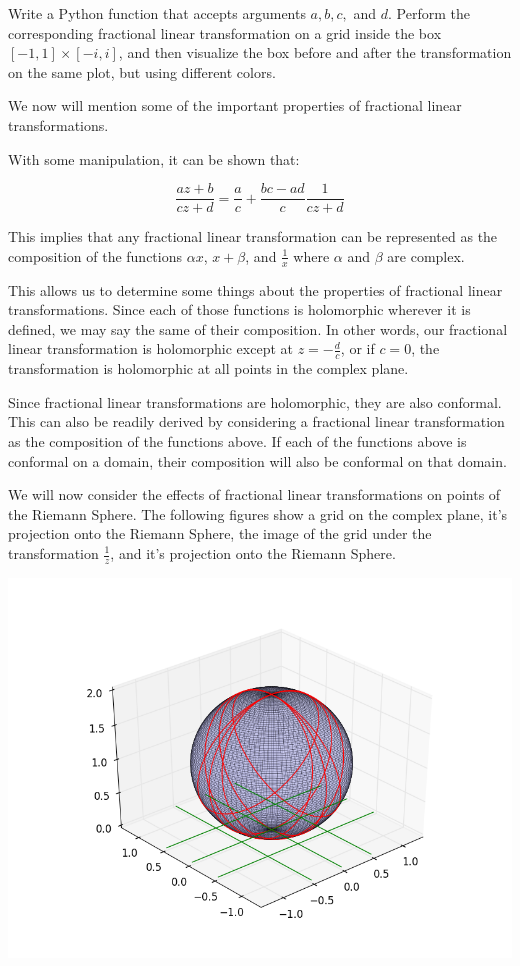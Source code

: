 \begin{problem} Write a Python function that accepts arguments $a,b,c,$ and $d$. Perform the corresponding fractional linear transformation on a grid inside the box $[-1,1]\times[-i,i]$, and then visualize the box before and after the transformation on the same plot, but using different colors.
\end{problem}

We now will mention some of the important properties of fractional linear transformations.

With some manipulation, it can be shown that:

$$\frac{az+b}{cz+d}=\frac{a}{c}+\frac{bc-ad}{c} \frac{1}{cz+d}$$

This implies that any fractional linear transformation can be represented as the composition of the functions $\alpha x$, $x+\beta$, and $\frac{1}{x}$ where $\alpha$ and $\beta$ are complex. 

This allows us to determine some things about the properties of fractional linear transformations. Since each of those functions is holomorphic wherever it is defined, we may say the same of their composition. In other words, our fractional linear transformation is holomorphic except at $z=-\frac{d}{c}$, or if $c=0$, the transformation is holomorphic at all points in the complex plane. 

Since fractional linear transformations are holomorphic, they are also conformal. This can also be readily derived by considering a fractional linear transformation as the composition of the functions above. If each of the functions above is conformal on a domain, their composition will also be conformal on that domain. 

We will now consider the effects of fractional linear transformations on points of the Riemann Sphere. The following figures show a grid on the complex plane, it's projection onto the Riemann Sphere, the image of the grid under the transformation $\frac{1}{z}$, and it's projection onto the Riemann Sphere. 

\includegraphics[width=\textwidth]{mobius2.png}

